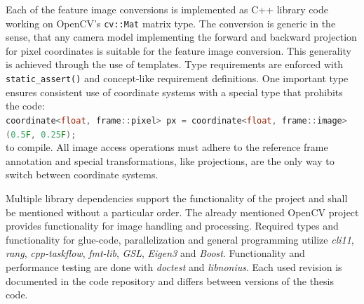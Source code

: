 Each of the feature image conversions is implemented as C++ library code working on OpenCV's\cite{opencv_library} \lstinline[basicstyle=\ttfamily]|cv::Mat| matrix type.
The conversion is generic in the sense, that any camera model implementing the forward and backward projection for pixel coordinates is suitable for the feature image conversion.
This generality is achieved through the use of templates.
Type requirements are enforced with \lstinline[basicstyle=\ttfamily]|static_assert()| and concept-like\cite{c++concepts} requirement definitions.
One important type ensures consistent use of coordinate systems with a special type that prohibits the code:\\
\texttt{\lstinline[language=C++,basicstyle=\footnotesize\ttfamily]|coordinate<float, frame::pixel> px = coordinate<float, frame::image>(0.5F, 0.25F);|}\\
to compile.
All image access operations must adhere to the reference frame annotation and special transformations, like projections, are the only way to switch between coordinate systems.

Multiple library dependencies support the functionality of the project and shall be mentioned without a particular order.
The already mentioned OpenCV\cite{opencv_library} project provides functionality for image handling and processing. 
Required types and functionality for glue-code, parallelization and general programming utilize \emph{cli11}\cite{cli11}, \emph{rang}\cite{rang}, \emph{cpp-taskflow}\cite{Huang2019CppTaskflowFT}, \emph{fmt-lib}\cite{fmtlib}, \emph{GSL}\cite{gsl}, \emph{Eigen3}\cite{eigenweb} and \emph{Boost}\cite{boost}.
Functionality and performance testing are done with \emph{doctest}\cite{doctest} and \emph{libnonius}\cite{libnonius}.
Each used revision is documented in the code repository and differs between versions of the thesis code.
